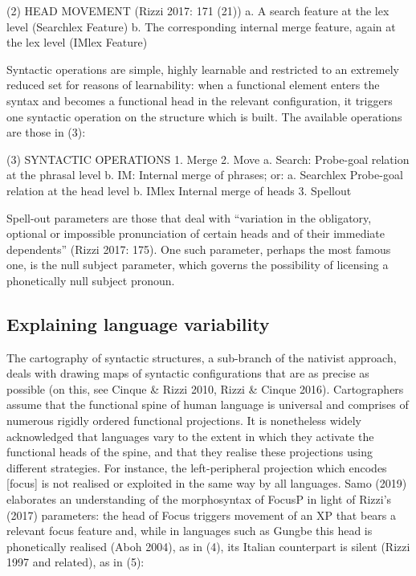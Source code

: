 \documentclass[fleqn,10pt]{wlscirep}
\begin{document}
(2)		HEAD MOVEMENT (Rizzi 2017: 171 (21)) 
a.	A search feature at the lex level (Searchlex Feature)
b.	The corresponding internal merge feature, again at the lex level (IMlex Feature)

Syntactic operations are simple, highly learnable and restricted to an extremely reduced set for reasons of learnability: when a functional element enters the syntax and becomes a functional head in the relevant configuration, it triggers one syntactic operation on the structure which is built. The available operations are those in (3):

(3)		SYNTACTIC OPERATIONS
			1.		Merge
			2.		Move
a.	Search:	Probe-goal relation at the phrasal level
b.	IM:	Internal merge of phrases; or:
a.	Searchlex	Probe-goal relation at the head level
b.	IMlex	Internal merge of heads
			3.		Spellout

Spell-out parameters are those that deal with “variation in the obligatory, optional or impossible pronunciation of certain heads and of their immediate dependents” (Rizzi 2017: 175). One such parameter, perhaps the most famous one, is the null subject parameter, which governs the possibility of licensing a phonetically null subject pronoun.

\subsection*{Explaining language variability}

The cartography of syntactic structures, a sub-branch of the nativist approach, deals with
 drawing maps of syntactic configurations that are as precise as possible (on this, see Cinque & Rizzi 2010, Rizzi & Cinque 2016). Cartographers assume that the functional spine of human language is universal and comprises of numerous rigidly ordered functional projections. It is nonetheless widely acknowledged that languages vary to the extent in which they activate the functional heads of the spine, and that they realise these projections using different strategies. 
For instance, the left-peripheral projection which encodes [focus] is not realised or exploited in the same way by all languages. Samo (2019) elaborates an understanding of the morphosyntax of FocusP in light of Rizzi’s (2017) parameters: the head of Focus triggers movement of an XP that bears a relevant focus feature and, while in languages such as Gungbe this head is phonetically realised (Aboh 2004), as in (4), its Italian counterpart is silent (Rizzi 1997 and related), as in (5):
\end{document}
